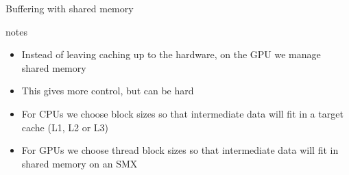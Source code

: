 \begin{frame}[fragile]{Buffering with shared memory}
    \begin{info}{notes}
        \begin{itemize}
            \item Instead of leaving caching up to the hardware, on the GPU we manage shared memory
            \item This gives more control, but can be hard
            \item For CPUs we choose block sizes so that intermediate data will fit in a target cache (L1, L2 or L3)
            \item For GPUs we choose thread block sizes so that intermediate data will fit in shared memory on an SMX
        \end{itemize}
    \end{info}

\end{frame}
